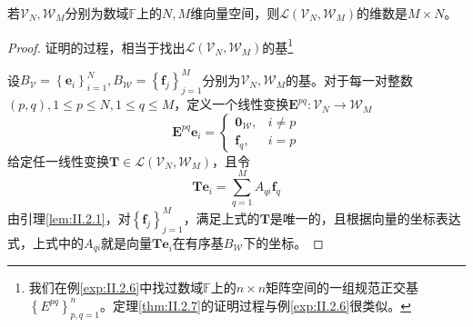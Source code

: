 \documentclass[main.tex]{subfiles}
\begin{document}
\begin{theorem}\label{thm:II.2.7}
    若$\mathcal{V}_N,\mathcal{W}_M$分别为数域$\mathbb{F}$上的$N,M$维向量空间，则$\mathcal{L}\left(\mathcal{V}_N,\mathcal{W}_M\right)$的维数是$M\times N$。
\end{theorem}
\begin{proof}
    证明的过程，相当于找出$\mathcal{L}\left(\mathcal{V}_N,\mathcal{W}_M\right)$的基\footnote{我们在例\ref{exp:II.2.6}中找过数域$\mathbb{F}$上的$n\times n$矩阵空间的一组规范正交基$\left\{E^{pq}\right\}_{p,q=1}^n$。定理\ref{thm:II.2.7}的证明过程与例\ref{exp:II.2.6}很类似。}

    设$B_\mathcal{V}=\left\{\mathbf{e}_i\right\}_{i=1}^N,B_\mathcal{W}=\left\{\mathbf{f}_j\right\}_{j=1}^M$分别为$\mathcal{V}_N,\mathcal{W}_M$的基。对于每一对整数$\left(p,q\right),1\leq p\leq N,1\leq q\leq M$，定义一个线性变换$\mathbf{E}^{pq}:\mathcal{V}_N\rightarrow\mathcal{W}_M$
    \[
        \mathbf{E}^{pq}\mathbf{e}_i=\left\{\begin{array}{cc}
            \mathbf{0}_\mathcal{W}, & i\neq p \\
            \mathbf{f}_q,           & i=p
        \end{array}\right.
    \]
    给定任一线性变换$\mathbf{T}\in\mathcal{L}\left(\mathcal{V}_N,\mathcal{W}_M\right)$，且令
    \[\mathbf{Te}_i=\sum_{q=1}^MA_{qi}\mathbf{f}_q\]
    由引理\ref{lem:II.2.1}，对$\left\{\mathbf{f}_j\right\}_{j=1}^M$，满足上式的$\mathbf{T}$是唯一的，且根据向量的坐标表达式，上式中的$A_{qi}$就是向量$\mathbf{Te}_i$在有序基$B_\mathcal{W}$下的坐标。


\end{proof}
\end{document}
